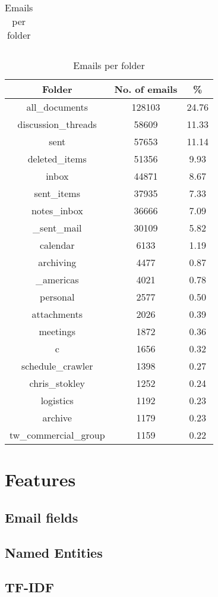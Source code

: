 \documentclass[senior,oneside]{UIUC}
\begin{document}
\begin{table}
{\begin{tabular}{c c c }
\\\end{tabular}
\caption{Emails per directory}
}
\parbox{.45\linewidth}{
\begin{tabular}{c c c }
\hline \hline
Folder & No. of emails & \% \\ [0.5ex]
\hline
all\_documents & 128103 & 24.76 \\
discussion\_threads & 58609 & 11.33 \\
sent & 57653 & 11.14 \\
deleted\_items & 51356 & 9.93 \\
inbox & 44871 & 8.67 \\
sent\_items & 37935 & 7.33 \\
notes\_inbox & 36666 & 7.09 \\
\_sent\_mail & 30109 & 5.82 \\
calendar & 6133 & 1.19 \\
archiving & 4477 & 0.87 \\
\_americas & 4021 & 0.78 \\
personal & 2577 & 0.50 \\
attachments & 2026 & 0.39 \\
meetings & 1872 & 0.36 \\
c & 1656 & 0.32 \\
schedule\_crawler & 1398 & 0.27 \\
chris\_stokley & 1252 & 0.24 \\
logistics & 1192 & 0.23 \\
archive & 1179 & 0.23 \\
tw\_commercial\_group & 1159 & 0.22 

\end{tabular}
\caption{Emails per folder}
}
\end{table}

\chapter{Features}
\section{Email fields}
\section{Named Entities}
\section{TF-IDF}
\end{document}
